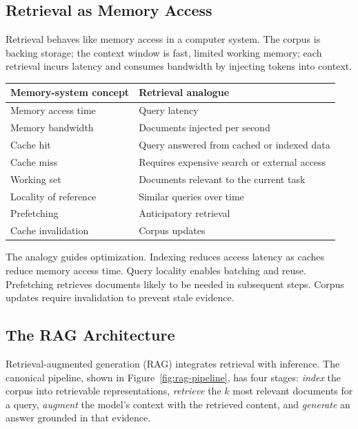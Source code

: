 \documentclass[11pt]{book}
\begin{document}
\subsection{Retrieval as Memory Access}

Retrieval behaves like memory access in a computer system. The corpus is backing storage; the context window is fast, limited working memory; each retrieval incurs latency and consumes bandwidth by injecting tokens into context.

\begin{center}
\begin{tabular}{ll}
\toprule
Memory-system concept & Retrieval analogue \\
\midrule
Memory access time & Query latency \\
Memory bandwidth & Documents injected per second \\
Cache hit & Query answered from cached or indexed data \\
Cache miss & Requires expensive search or external access \\
Working set & Documents relevant to the current task \\
Locality of reference & Similar queries over time \\
Prefetching & Anticipatory retrieval \\
Cache invalidation & Corpus updates \\
\bottomrule
\end{tabular}
\end{center}

The analogy guides optimization. Indexing reduces access latency as caches reduce memory access time. Query locality enables batching and reuse. Prefetching retrieves documents likely to be needed in subsequent steps. Corpus updates require invalidation to prevent stale evidence.

\subsection{The RAG Architecture}

Retrieval-augmented generation (RAG) \cite{lewis2020rag} integrates retrieval with inference. The canonical pipeline, shown in Figure~\ref{fig:rag-pipeline}, has four stages: \textit{index} the corpus into retrievable representations, \textit{retrieve} the $k$ most relevant documents for a query, \textit{augment} the model's context with the retrieved content, and \textit{generate} an answer grounded in that evidence.
\end{document}
